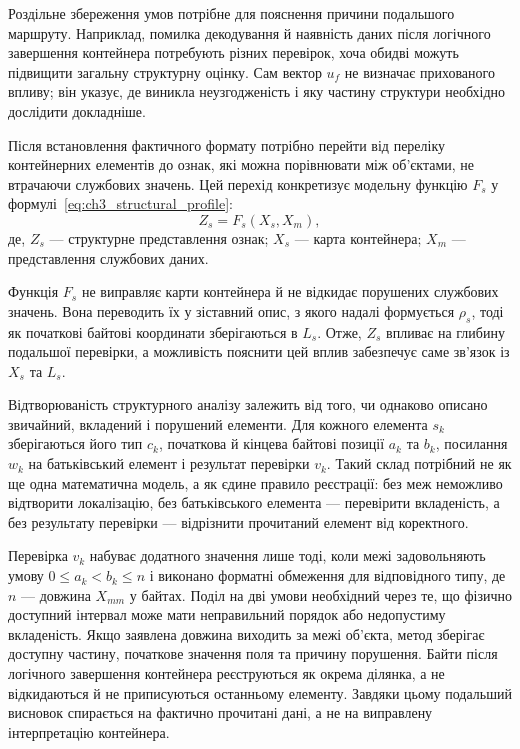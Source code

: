 Роздільне збереження умов потрібне для пояснення причини подальшого маршруту. Наприклад, помилка декодування й наявність даних після логічного завершення контейнера потребують різних перевірок, хоча обидві можуть підвищити загальну структурну оцінку. Сам вектор $u_f$ не визначає прихованого впливу; він указує, де виникла неузгодженість і яку частину структури необхідно дослідити докладніше.

Після встановлення фактичного формату потрібно перейти від переліку контейнерних елементів до ознак, які можна порівнювати між об’єктами, не втрачаючи службових значень. Цей перехід конкретизує модельну функцію $F_s$ у формулі~\eqref{eq:ch3_structural_profile}:
\begin{equation}
Z_s=F_s(X_s,X_m),
\label{eq:ch3_structural_profile}
\end{equation}
де, $Z_s$ --- структурне представлення ознак; $X_s$ --- карта контейнера; $X_m$ --- представлення службових даних.

Функція $F_s$ не виправляє карти контейнера й не відкидає порушених службових значень. Вона переводить їх у зіставний опис, з якого надалі формується $\rho_s$, тоді як початкові байтові координати зберігаються в $L_s$. Отже, $Z_s$ впливає на глибину подальшої перевірки, а можливість пояснити цей вплив забезпечує саме зв’язок із $X_s$ та $L_s$.

Відтворюваність структурного аналізу залежить від того, чи однаково описано звичайний, вкладений і порушений елементи. Для кожного елемента $s_k$ зберігаються його тип $c_k$, початкова й кінцева байтові позиції $a_k$ та $b_k$, посилання $w_k$ на батьківський елемент і результат перевірки $v_k$. Такий склад потрібний не як ще одна математична модель, а як єдине правило реєстрації: без меж неможливо відтворити локалізацію, без батьківського елемента --- перевірити вкладеність, а без результату перевірки --- відрізнити прочитаний елемент від коректного.

Перевірка $v_k$ набуває додатного значення лише тоді, коли межі задовольняють умову $0\leq a_k<b_k\leq n$ і виконано форматні обмеження для відповідного типу, де $n$ --- довжина $X_{mm}$ у байтах. Поділ на дві умови необхідний через те, що фізично доступний інтервал може мати неправильний порядок або недопустиму вкладеність. Якщо заявлена довжина виходить за межі об’єкта, метод зберігає доступну частину, початкове значення поля та причину порушення. Байти після логічного завершення контейнера реєструються як окрема ділянка, а не відкидаються й не приписуються останньому елементу. Завдяки цьому подальший висновок спирається на фактично прочитані дані, а не на виправлену інтерпретацію контейнера.

